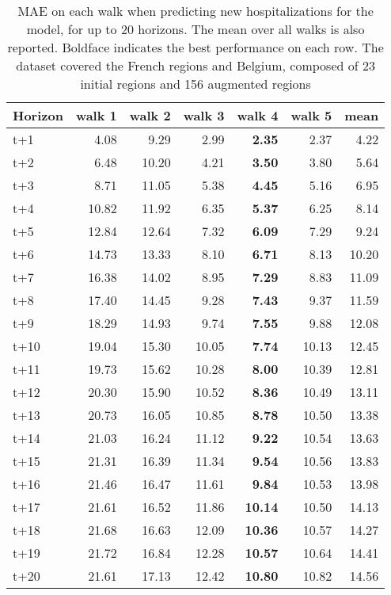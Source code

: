 \begin{table}[H]
\centering
\caption{MAE on each walk when predicting new hospitalizations for the model, for up to 20 horizons. The mean over all walks is also reported. Boldface indicates the best performance on each row. The dataset covered the French regions and Belgium, composed of 23 initial regions and 156 augmented regions }
\label{tab:MAE_walk_baseline}
\begin{tabular}{lrrrrrr}
\toprule
Horizon &  walk 1 &  walk 2 &  walk 3 &  walk 4 &  walk 5 &  mean \\
\midrule
t+1  & 4.08  & 9.29  & 2.99  & \textbf{2.35}  & 2.37  & 4.22  \\
t+2  & 6.48  & 10.20  & 4.21  & \textbf{3.50}  & 3.80  & 5.64  \\
t+3  & 8.71  & 11.05  & 5.38  & \textbf{4.45}  & 5.16  & 6.95  \\
t+4  & 10.82  & 11.92  & 6.35  & \textbf{5.37}  & 6.25  & 8.14  \\
t+5  & 12.84  & 12.64  & 7.32  & \textbf{6.09}  & 7.29  & 9.24  \\
t+6  & 14.73  & 13.33  & 8.10  & \textbf{6.71}  & 8.13  & 10.20  \\
t+7  & 16.38  & 14.02  & 8.95  & \textbf{7.29}  & 8.83  & 11.09  \\
t+8  & 17.40  & 14.45  & 9.28  & \textbf{7.43}  & 9.37  & 11.59  \\
t+9  & 18.29  & 14.93  & 9.74  & \textbf{7.55}  & 9.88  & 12.08  \\
t+10  & 19.04  & 15.30  & 10.05  & \textbf{7.74}  & 10.13  & 12.45  \\
t+11  & 19.73  & 15.62  & 10.28  & \textbf{8.00}  & 10.39  & 12.81  \\
t+12  & 20.30  & 15.90  & 10.52  & \textbf{8.36}  & 10.49  & 13.11  \\
t+13  & 20.73  & 16.05  & 10.85  & \textbf{8.78}  & 10.50  & 13.38  \\
t+14  & 21.03  & 16.24  & 11.12  & \textbf{9.22}  & 10.54  & 13.63  \\
t+15  & 21.31  & 16.39  & 11.34  & \textbf{9.54}  & 10.56  & 13.83  \\
t+16  & 21.46  & 16.47  & 11.61  & \textbf{9.84}  & 10.53  & 13.98  \\
t+17  & 21.61  & 16.52  & 11.86  & \textbf{10.14}  & 10.50  & 14.13  \\
t+18  & 21.68  & 16.63  & 12.09  & \textbf{10.36}  & 10.57  & 14.27  \\
t+19  & 21.72  & 16.84  & 12.28  & \textbf{10.57}  & 10.64  & 14.41  \\
t+20  & 21.61  & 17.13  & 12.42  & \textbf{10.80}  & 10.82  & 14.56  \\

\bottomrule
\end{tabular}
\end{table}
